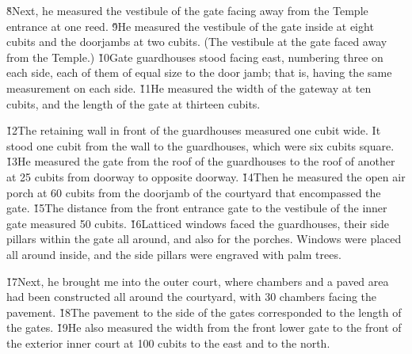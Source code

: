 \v{8}Next, he measured the vestibule of the gate facing away from the Temple entrance at one reed. \v{9}He measured the vestibule of the gate inside at eight cubits and the doorjambs at two cubits. (The vestibule at the gate faced away from the Temple.) \v{10}Gate guardhouses stood facing east, numbering three on each side, each of them of equal size to the door jamb; that is, having the same measurement on each side. \v{11}He measured the width of the gateway at ten cubits, and the length of the gate at thirteen cubits.

\v{12}The retaining wall in front of the guardhouses measured one cubit wide. It stood one cubit from the wall to the guardhouses, which were six cubits square. \v{13}He measured the gate from the roof of the guardhouses to the roof of another at 25 cubits from doorway to opposite doorway. \v{14}Then he measured the open air porch at 60 cubits from the doorjamb of the courtyard that encompassed the gate. \v{15}The distance from the front entrance gate to the vestibule of the inner gate measured 50 cubits. \v{16}Latticed windows faced the guardhouses, their side pillars within the gate all around, and also for the porches. Windows were placed all around inside, and the side pillars were engraved with palm trees.

\v{17}Next, he brought me into the outer court, where chambers and a paved area had been constructed all around the courtyard, with 30 chambers facing the pavement. \v{18}The pavement to the side of the gates corresponded to the length of the gates. \v{19}He also measured the width from the front lower gate to the front of the exterior inner court at 100 cubits to the east and to the north.

